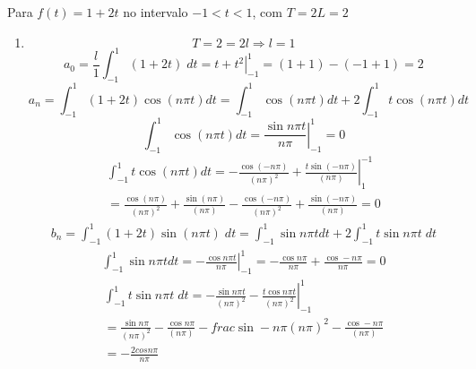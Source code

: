 \documentclass[12pt]{article}
\newcommand*\Eval[3]{\left.#1\right\rvert_{#2}^{#3}}
\begin{document}
\section{}
 Para $f(t) = 1+2t$ no intervalo $-1 < t < 1$, com $T=2L=2$
\begin{enumerate}[label=S.]
\item
	\begin{equation}
    T = 2 = 2l \Rightarrow l=1
    \end{equation}
    \begin{equation}
    a_{0} = \frac{l}{1} \int_{-1}^{1} (1+2t)\; dt = \Eval{t + t^{2}}{-1}{1} = (1+1)-(-1+1) = 2
    \end{equation}
    \begin{equation}
    a_{n} = \int_{-1}^{1} (1+2t) \cos(n\pi t) dt = \int_{-1}^{1} \cos(n\pi t) dt + 2 \int_{-1}^{1} t \cos(n\pi t) dt
    \end{equation}
    \begin{equation}
        \int_{-1}^{1} \cos(n\pi t) dt = \Eval{\frac{\sin n\pi t}{n\pi}}{-1}{1} = 0
    \end{equation}
    \begin{equation}
    \begin{split}
    \int_{-1}^{1} t \cos(n\pi t) dt = \Eval{-\frac{\cos(-n\pi)}{(n\pi)^{2}}+\frac{t \sin(-n\pi)}{(n\pi)}}{1}{-1} \\= \frac{\cos(n\pi)}{(n\pi)^{2}}+\frac{\sin(n\pi)}{(n\pi)} - \frac{\cos(-n\pi)}{(n\pi)^{2}}+\frac{\sin(-n\pi)}{(n\pi)} = 0
    \end{split}\end{equation}
    \begin{equation}
    \begin{split}
    b_{n} = \int_{-1}^{1} (1+2t)\sin (n\pi t)\; dt = \int_{-1}^{1} \sin n\pi t  dt + 2\int_{-1}^{1} t \sin n\pi t \; dt
    \end{split}\end{equation}
    \begin{equation}
    \begin{split}
    \int_{-1}^{1} \sin n\pi t  dt = \Eval{-\frac{\cos n\pi t}{n\pi}}{-1}{1} = -\frac{\cos n\pi}{n\pi} + \frac{\cos -n\pi}{n\pi} = 0
    \end{split}\end{equation}
    \begin{equation}
    \begin{split}
    \int_{-1}^{1} t \sin n\pi t \; dt = \Eval{-\frac{\sin n\pi t}{(n\pi)^{2}} - \frac{t\cos n\pi t}{(n\pi)^{2}}}{-1}{1}\\ = \frac{\sin n\pi }{(n\pi)^{2}} - \frac{\cos n\pi }{(n\pi)} - frac{\sin -n\pi }{(n\pi)^{2}} - \frac{\cos -n\pi }{(n\pi)} \\= -\frac{2 cos n\pi}{n\pi}

\end{split}
\end{equation}
\end{enumerate}
\end{document}
